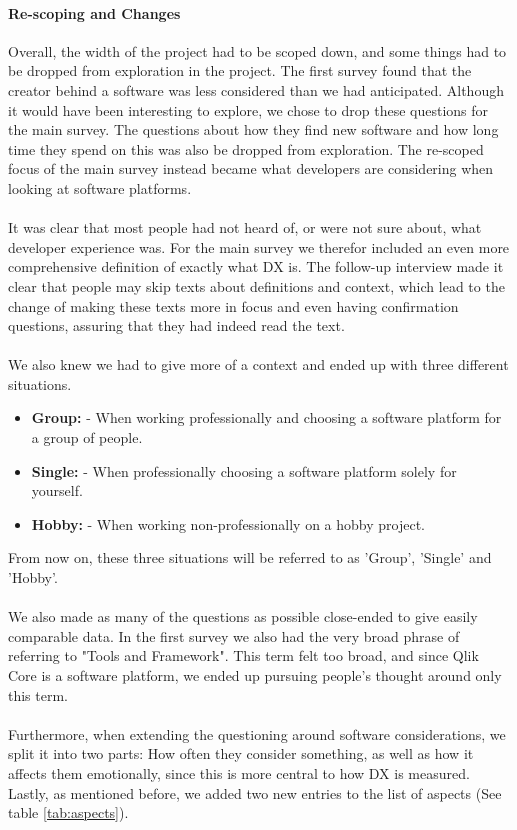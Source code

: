 \documentclass{article}
\begin{document}
\paragraph{Re-scoping and Changes}
Overall, the width of the project had to be scoped down, and some
things had to be dropped from exploration in the project. The
first survey found that the creator behind a software was less
considered than we had anticipated. Although it would have been interesting to explore, we chose to drop these questions for the main survey.
The questions about how they find new software
and how long time they spend on this was also be dropped from
exploration. The re-scoped focus of the main survey instead became what developers are considering when looking at software platforms.
\\ \\
It was clear that most people had not heard of, or were not sure about,
what developer experience was. For the main survey we therefor included an even more comprehensive definition of exactly what DX is.
The follow-up interview made it clear that people may skip texts about definitions and context, which lead to the change of making these texts more in focus and even having confirmation questions, assuring that they had indeed read the text.
\\ \\
We also knew we had to give more of a context and ended up with three different situations.
\begin{itemize}[label={}]
\item \textbf{Group:} - When working professionally and choosing a software platform for a group of people.
\item \textbf{Single:} - When professionally choosing a software platform solely for yourself.
\item \textbf{Hobby:} - When working non-professionally on a hobby project.
\end{itemize}
From now on, these three situations will be referred to as 'Group', 'Single' and 'Hobby'.
\\ \\
We also made as many of the questions as possible close-ended to give easily comparable data. In the first survey we also had the very broad phrase of referring to "Tools and Framework". This term felt too broad, and since Qlik Core is a software platform, we ended up pursuing people's thought around only this term.
\\ \\
Furthermore, when extending the questioning around software considerations, we split it into two parts: How often they consider something, as well as how it affects them emotionally, since this is more central to how DX is measured. Lastly, as mentioned before, we added two new entries to the list of aspects (See table \ref{tab:aspects}).
\end{document}
